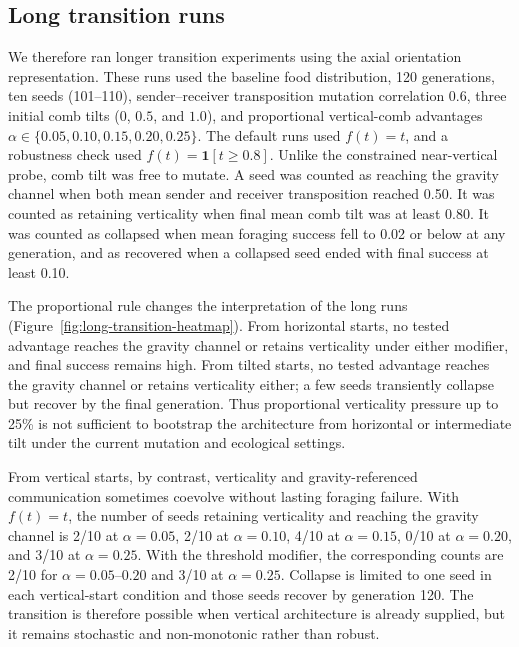 \documentclass[11pt]{article}
\begin{document}
\subsection{Long transition runs}

We therefore ran longer transition experiments using the axial orientation
representation. These runs used the baseline food distribution, 120
generations, ten seeds (101--110), sender--receiver transposition mutation
correlation 0.6, three initial comb tilts ($0$, $0.5$, and $1.0$), and
proportional vertical-comb advantages $\alpha \in \{0.05,0.10,0.15,0.20,0.25\}$.
The default runs used $f(t)=t$, and a robustness check used
$f(t)=\mathbf{1}[t \geq 0.8]$. Unlike the constrained near-vertical probe,
comb tilt was free to mutate. A seed was counted as reaching the gravity
channel when both mean sender and receiver transposition reached 0.50. It was
counted as retaining verticality when final mean comb tilt was at least 0.80.
It was counted as collapsed when mean foraging success fell to 0.02 or below
at any generation, and as recovered when a collapsed seed ended with final
success at least 0.10.



The proportional rule changes the interpretation of the long runs
(Figure~\ref{fig:long-transition-heatmap}). From horizontal starts, no tested
advantage reaches the gravity channel or retains verticality under either
modifier, and final success remains high. From tilted starts, no tested
advantage reaches the gravity channel or retains verticality either; a few
seeds transiently collapse but recover by the final generation. Thus
proportional verticality pressure up to 25\% is not sufficient to bootstrap the
architecture from horizontal or intermediate tilt under the current mutation
and ecological settings.

From vertical starts, by contrast, verticality and gravity-referenced
communication sometimes coevolve without lasting foraging failure. With
$f(t)=t$, the number of seeds retaining verticality and reaching the gravity
channel is 2/10 at $\alpha=0.05$, 2/10 at $\alpha=0.10$, 4/10 at
$\alpha=0.15$, 0/10 at $\alpha=0.20$, and 3/10 at $\alpha=0.25$. With the
threshold modifier, the corresponding counts are 2/10 for
$\alpha=0.05$--$0.20$ and 3/10 at $\alpha=0.25$. Collapse is limited to one
seed in each vertical-start condition and those seeds recover by generation
120. The transition is therefore possible when vertical architecture is already
supplied, but it remains stochastic and non-monotonic rather than robust.
\end{document}
